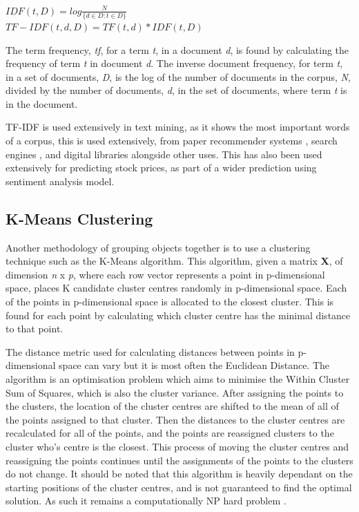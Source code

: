  \begin{center}
 	\\
 	$IDF(t, D) = log\frac{N}{\{d \in D : t \in D\}}$\\
 	$TF-IDF(t, d, D) = TF(t, d) * IDF(t, D) $
 \end{center}
 
The term frequency, \textit{tf}, for a term \textit{t}, in a document \textit{d}, is found by calculating the frequency of term \textit{t} in document \textit{d}. The inverse document frequency, for term \textit{t}, in a set of documents, \textit{D}, is the log of the number of documents in the corpus, \textit{N},  divided by the number of documents, \textit{d}, in the set of documents, where term \textit{t} is in the document.  
 
 TF-IDF is used extensively in text mining, as it shows the most important words of a corpus, this is used extensively, from paper recommender systems \cite{beel2016paper}, search engines \cite{xu2014pos}, and digital libraries \cite{philip2014application} alongside other uses. This has also been used extensively for predicting stock prices, as part of a wider prediction using sentiment analysis model. 
 
 
\subsection{K-Means Clustering}
Another methodology of grouping objects together is to use a clustering technique such as the K-Means algorithm. This algorithm, given a matrix \textbf{X}, of dimension \textit{n} x \textit{p}, where each row vector represents a point in p-dimensional space, places K candidate cluster centres randomly in p-dimensional space. Each of the points in p-dimensional space is allocated to the closest cluster. This is found for each point by calculating which cluster centre has the minimal distance to that point. 

The distance metric used for calculating distances between points in p-dimensional space can vary but it is most often the Euclidean Distance. The algorithm is an optimisation problem which aims to minimise the Within Cluster Sum of Squares, which is also the cluster variance. After assigning the points to the clusters, the location of the cluster centres are shifted to the mean of all of the points assigned to that cluster. Then the distances to the cluster centres are recalculated for all of the points, and the points are reassigned clusters to the cluster who's centre is the closest. This process of moving the cluster centres and reassigning the points continues until the assignments of the points to the clusters do not change. It should be noted that this algorithm is heavily dependant on the starting positions of the cluster centres, and is not guaranteed to find the optimal solution. As such it remains a computationally NP hard problem \cite{vattani2009hardness}. 
 
